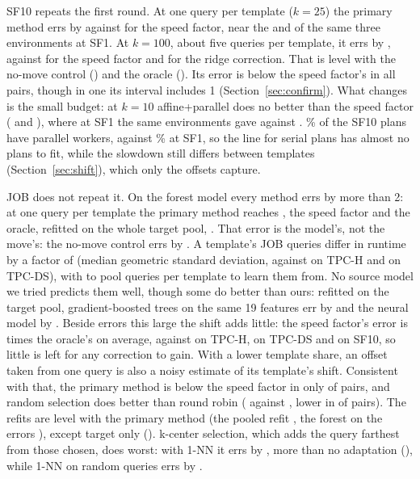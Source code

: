 \documentclass[conference]{IEEEtran}
\begin{document}
SF10 repeats the first round. At one query per template ($k=25$) the
primary method errs by \XeTpchTenPrimaryKTwoFive{} against
\XeTpchTenSpeedKTwoFive{} for the speed factor, near the
\XcOneTpchTenTpchKTwoFivePrimary{} and \XcOneTpchTenTpchKTwoFiveSpeed{} of
the same three environments at SF1. At $k=100$, about five queries per
template, it errs by \XTpchTenKHPrimary, against \XTpchTenKHSpeed{} for the
speed factor and \XTpchTenKHRidge{} for the ridge correction. That is level
with the no-move control (\XTpchTenKHControl) and the oracle
(\XTpchTenKHOracle). Its error is below the speed factor's in all
\XeTpchTenHTwoPoint{} pairs, though in one its interval includes 1
(Section~\ref{sec:confirm}). What changes is the small budget: at $k=10$
affine+parallel does no better than the speed factor
(\XTpchTenKOneZeroAffinePar{} and \XTpchTenKOneZeroSpeed), where at SF1 the
same environments gave \XcOneTpchTenTpchKOneZeroAffinePar{} against
\XcOneTpchTenTpchKOneZeroSpeed. \XeParallelTpchTen\% of the SF10 plans have
parallel workers, against \XeParallelTpch\% at SF1, so the line for serial
plans has almost no plans to fit, while the slowdown still differs between
templates (Section~\ref{sec:shift}), which only the offsets capture.

JOB does not repeat it. On the forest model every method errs by more than
2: at one query per template the primary method reaches \XJobKHPrimary, the
speed factor \XJobKHSpeed{} and the oracle, refitted on the whole target
pool, \XJobKHOracle. That error is the model's, not the move's: the no-move
control errs by \XJobKHControl. A template's JOB queries differ in runtime
by a factor of \XeSpreadJob{} (median geometric standard deviation, against
\XeSpreadTpch{} on TPC-H and \XeSpreadTpcds{} on TPC-DS), with
\XeJobPoolMin{} to \XeJobPoolMax{} pool queries per template to learn them
from. No source model we tried predicts them well, though some do better
than ours: refitted on the target pool, gradient-boosted trees on the same
19 features err by \XeSrcJobBoostingOracle{} and the neural model by
\NNExtJobRrNnOracleKThreeThree. Beside errors this large the shift adds
little: the speed factor's error is \XeRoomJob{} times the oracle's on
average, against \XeRoomTpch{} on TPC-H, \XeRoomTpcds{} on TPC-DS and
\XeRoomTpchTen{} on SF10, so little is left for any correction to gain.
With a lower template share, an offset taken from one query is also a
noisy estimate of its template's shift. Consistent with that, the primary
method is below the speed factor in only \XeJobHTwoPoint{} of \XJobPairs{}
pairs, and random selection does better than round robin
(\XeJobPrimaryRand{} against \XJobKHPrimary, lower in \XeJobRandBelowRr{} of
\XJobPairs{} pairs). The refits are level with the primary method (the
pooled refit \XeJobPooledRand, the forest on the errors
\XeJobForestResidRand), except target only (\XeJobTargetRand). k-center
selection, which adds the query farthest from those chosen, does worst:
with 1-NN it errs by \XJobKHKnn, more than no adaptation (\XJobKHNone),
while 1-NN on random queries errs by \XeJobKnnRand.
\end{document}
